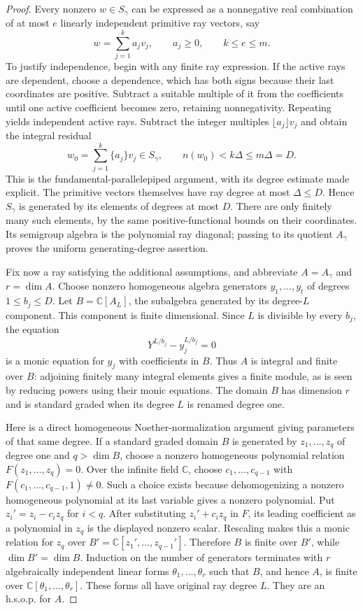 \documentclass[11pt,a4paper]{article}
\begin{document}
\begin{proof}
Every nonzero $w\in S_\gamma$ can be expressed as a nonnegative real
combination of at most $e$ linearly independent primitive ray vectors,
say
\[
 w=\sum_{j=1}^k a_jv_j,\qquad a_j\ge0,\qquad k\le e\le m.
\]
To justify independence, begin with any finite ray expression.
If the active rays are dependent, choose a dependence, which has both
signs because their last coordinates are positive. Subtract a suitable
multiple of it from the coefficients until one active coefficient
becomes zero, retaining nonnegativity. Repeating yields independent
active rays.
Subtract the integer multiples $\lfloor a_j\rfloor v_j$ and obtain
the integral residual
\[
 w_0=\sum_{j=1}^k\{a_j\}v_j\in S_\gamma,
 \qquad n(w_0)<k\Delta\le m\Delta=D.
 \tag{P-F16e}
\]
This is the fundamental-parallelepiped argument, with its degree
estimate made explicit. The primitive vectors themselves have ray
degree at most $\Delta\le D$. Hence $S_\gamma$ is generated by its
elements of degrees at most $D$. There are only finitely many such
elements, by the same positive-functional bounds on their coordinates.
Its semigroup algebra is the polynomial ray diagonal; passing to its
quotient $A_\gamma$ proves the uniform generating-degree assertion.

Fix now a ray satisfying the additional assumptions, and abbreviate
$A=A_\gamma$ and $r=\dim A$. Choose nonzero homogeneous algebra
generators $y_1,\ldots,y_t$ of degrees $1\le b_j\le D$.
Let $B=\mathbb C[A_L]$, the subalgebra generated by its degree-$L$
component. This component is finite dimensional. Since $L$ is divisible
by every $b_j$, the equation
\[
 Y^{L/b_j}-y_j^{L/b_j}=0
\]
is a monic equation for $y_j$ with coefficients in $B$.
Thus $A$ is integral and finite over $B$: adjoining finitely many
integral elements gives a finite module, as is seen by reducing powers
using their monic equations. The domain $B$ has dimension $r$ and is
standard graded when its degree $L$ is renamed degree one.

Here is a direct homogeneous Noether-normalization argument giving
parameters of that same degree. If a standard graded domain $B$ is
generated by $z_1,\ldots,z_q$ of degree one and $q>\dim B$, choose a
nonzero homogeneous polynomial relation $F(z_1,\ldots,z_q)=0$.
Over the infinite field $\mathbb C$, choose $c_1,\ldots,c_{q-1}$ with
$F(c_1,\ldots,c_{q-1},1)\ne0$. Such a choice exists because
dehomogenizing a nonzero homogeneous polynomial at its last variable
gives a nonzero polynomial. Put $z_i'=z_i-c_i z_q$ for $i<q$.
After substituting $z_i'+c_i z_q$ in $F$, its leading coefficient
as a polynomial in $z_q$ is the displayed nonzero scalar.
Rescaling makes this a monic relation for $z_q$ over
$B'=\mathbb C[z_1',\ldots,z_{q-1}']$. Therefore $B$ is finite over
$B'$, while $\dim B'=\dim B$. Induction on the number of generators
terminates with $r$ algebraically independent linear forms
$\theta_1,\ldots,\theta_r$ such that $B$, and hence $A$, is finite
over $\mathbb C[\theta_1,\ldots,\theta_r]$. These forms all have
original ray degree $L$. They are an h.s.o.p. for $A$.


\end{proof}
\end{document}
